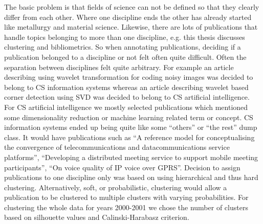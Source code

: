 The basic problem is that fields of science can not be 
defined so that they clearly differ from each other. Where one 
discipline ends the other has already started like metallurgy and 
material science. Likewise, there are lots of publications that 
handle topics belonging to more than one discipline, e.g. this 
thesis discusses clustering and bibliometrics. So when annotating 
publications, deciding if a publication belonged to
a discipline or not felt often quite difficult. Often the 
separation between disciplines felt quite arbitrary. For example
an article describing using wavelet transformation for coding noisy
images was decided to belong to CS information systems whereas an
article describing wavelet based corner detection using SVD was
decided to belong to CS artificial intelligence.
For CS artificial intelligence we mostly selected publications 
which mentioned some dimensionality reduction or machine learning 
related term or concept. CS information systems ended up being 
quite like some ``others'' or ``the rest'' dump class.
It would have publications such as
``A reference model for conceptualising the convergence of 
telecommunications and datacommunications service platforms'',
``Developing a distributed meeting service to support mobile 
meeting participants'',
``On voice quality of IP voice over GPRS''.
Decision to assign publications to one discipline only was based 
on using hierarchical and thus hard clustering. Alternatively, 
soft, or probabilistic, clustering would allow a publication to 
be clustered to multiple clusters with varying probabilities. 
For clustering the whole data for years 2000-2001 we chose the 
number of clusters based on silhouette values and 
Calinski-Harabasz criterion.



